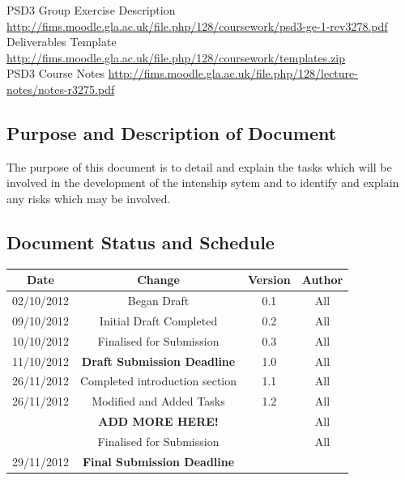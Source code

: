 \documentclass{l3deliverable}
\begin{document}
{{PSD3 Group Exercise Description \url{http://fims.moodle.gla.ac.uk/file.php/128/coursework/psd3-ge-1-rev3278.pdf}}\\

Deliverables Template \url{http://fims.moodle.gla.ac.uk/file.php/128/coursework/templates.zip}\\

PSD3 Course Notes \url{http://fims.moodle.gla.ac.uk/file.php/128/lecture-notes/notes-r3275.pdf}\\

\subsection{Purpose and Description of Document}

The purpose of this document is to detail and explain the tasks which will be involved in the development of the intenship sytem and to identify and explain any risks which may be involved.

\subsection{Document Status and Schedule}

\begin{center}{
\begin{tabular}{|c|c|c|c|}
\hline \textbf{Date} &\textbf{Change} & \textbf{Version} & \textbf{Author}\\ 
\hline 02/10/2012 & Began Draft & 0.1 & All \\ 
\hline 09/10/2012 & Initial Draft Completed & 0.2 & All \\ 
\hline 10/10/2012 & Finalised for Submission & 0.3 & All\\ 
\hline 11/10/2012 & \textbf{Draft Submission Deadline} & 1.0 & All\\ 
\hline
\hline 26/11/2012 & Completed introduction section & 1.1 & All\\
\hline 26/11/2012 & Modified and Added Tasks & 1.2 & All\\ 
\hline & \textbf{ADD MORE HERE!} & & All\\
\hline  & Finalised for Submission &  & All\\
\hline 29/11/2012 & \textbf{Final Submission Deadline} &  & \\ 
\hline 
\end{tabular} }
\end{center}


}
\end{document}
